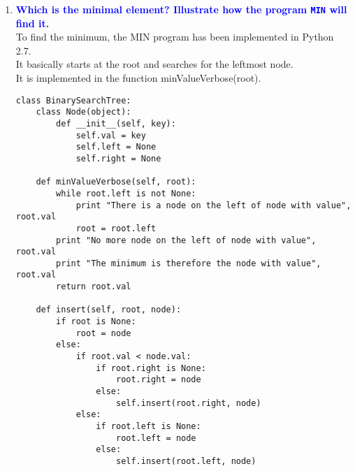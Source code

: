 \documentclass[11pt]{article}
\begin{document}
\begin{enumerate}
\begin{enumerate}
    \item \textbf{\textcolor{blue}{Which is the minimal element?
    Illustrate how the program {\tt MIN} will find it.}}
        \\ To find the minimum, the MIN program has been implemented in Python 2.7.
        \\ It basically starts at the root and searches for the leftmost node.
        \\ It is implemented in the function minValueVerbose(root).
        \begin{verbatim}
class BinarySearchTree:
    class Node(object):
        def __init__(self, key):
            self.val = key
            self.left = None
            self.right = None
        
    def minValueVerbose(self, root):
        while root.left is not None:
            print "There is a node on the left of node with value", root.val
            root = root.left    
        print "No more node on the left of node with value", root.val
        print "The minimum is therefore the node with value", root.val
        return root.val
        
    def insert(self, root, node):
        if root is None:
            root = node
        else:
            if root.val < node.val:
                if root.right is None:
                    root.right = node
                else:
                    self.insert(root.right, node)
            else:
                if root.left is None:
                    root.left = node
                else:
                    self.insert(root.left, node)
            

\end{verbatim}
\end{enumerate}
\end{enumerate}
\end{document}
